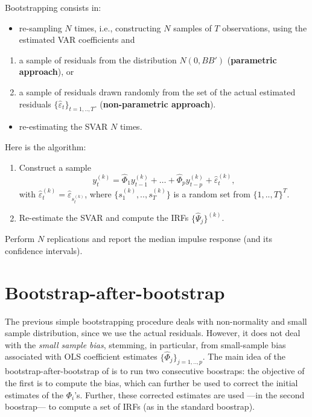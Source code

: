 \documentclass[
  12pt,
]{book}
\providecommand{\tightlist}{%
  \setlength{\itemsep}{0pt}\setlength{\parskip}{0pt}}
\theoremstyle{definition}
\theoremstyle{definition}
\theoremstyle{definition}
\theoremstyle{definition}
\theoremstyle{remark}
\begin{document}
Bootstrapping consists in:

\begin{itemize}
\tightlist
\item
  re-sampling \(N\) times, i.e., constructing \(N\) samples of \(T\) observations, using the estimated
  VAR coefficients and
\end{itemize}

\begin{enumerate}
\def\labelenumi{\alph{enumi}.}
\tightlist
\item
  a sample of residuals from the distribution \(N(0,BB')\) (\textbf{parametric approach}), or
\item
  a sample of residuals drawn randomly from the set of the actual estimated residuals \(\{\hat\varepsilon_t\}_{t=1,..,T}\). (\textbf{non-parametric approach}).
\end{enumerate}

\begin{itemize}
\tightlist
\item
  re-estimating the SVAR \(N\) times.
\end{itemize}

Here is the algorithm:

\begin{enumerate}
\def\labelenumi{\arabic{enumi}.}
\tightlist
\item
  Construct a sample
  \[
  y_t^{(k)}=\widehat{\Phi}_1 y_{t-1}^{(k)} + \dots + \widehat{\Phi}_p y_{t-p}^{(k)} + \hat\varepsilon_t^{(k)},
  \]
  with \(\hat\varepsilon_{t}^{(k)}=\hat\varepsilon_{s_t^{(k)}}\), where \(\{s_1^{(k)},..,s_T^{(k)}\}\) is a random set from \(\{1,..,T\}^T\).
\item
  Re-estimate the SVAR and compute the IRFs \(\{\widehat{\Psi}_j\}^{(k)}\).
\end{enumerate}

Perform \(N\) replications and report the median impulse response (and its confidence intervals).

\hypertarget{bootstrap-after-bootstrap}{%
\section{Bootstrap-after-bootstrap}\label{bootstrap-after-bootstrap}}

The previous simple bootstrapping procedure deals with non-normality and small sample distribution, since we use the actual residuals. However, it does not deal with the \emph{small sample bias}, stemming, in particular, from small-sample bias associated with OLS coefficient estimates \(\{\widehat{\Phi}_j\}_{j=1,..,p}\). The main idea of the bootstrap-after-bootstrap of \citet{Kilian_1998} is to run two consecutive boostraps: the objective of the first is to compute the bias, which can further be used to correct the initial estimates of the \(\Phi_i\)'s. Further, these corrected estimates are used ---in the second boostrap--- to compute a set of IRFs (as in the standard boostrap).
\end{document}
